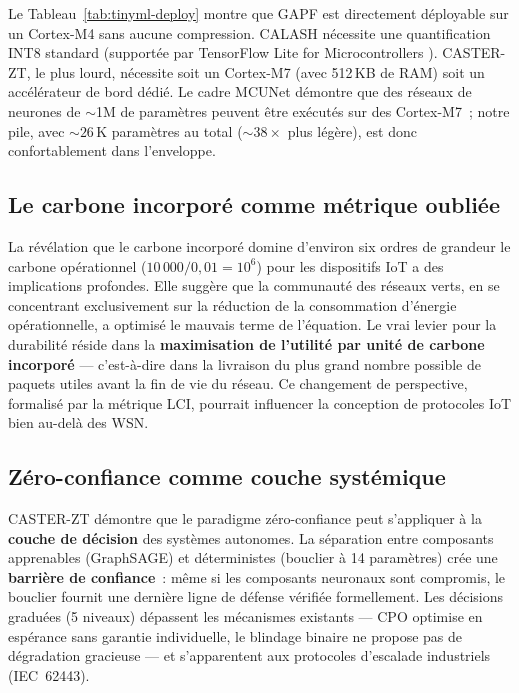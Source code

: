 Le Tableau~\ref{tab:tinyml-deploy} montre que GAPF est directement déployable sur un Cortex-M4 sans aucune compression. CALASH nécessite une quantification INT8 standard (supportée par TensorFlow Lite for Microcontrollers \cite{david2021tensorflow}). CASTER-ZT, le plus lourd, nécessite soit un Cortex-M7 (avec 512\,KB de RAM) soit un accélérateur de bord dédié. Le cadre MCUNet \cite{Lin2020MCUNet} démontre que des réseaux de neurones de $\sim$1M de paramètres peuvent être exécutés sur des Cortex-M7~; notre pile, avec ${\sim}26$\,K paramètres au total (${\sim}38\times$ plus légère), est donc confortablement dans l'enveloppe.

\subsection{Le carbone incorporé comme métrique oubliée}

La révélation que le carbone incorporé domine d'environ six ordres de grandeur le carbone opérationnel ($10\,000/0{,}01 = 10^6$) pour les dispositifs IoT a des implications profondes. Elle suggère que la communauté des réseaux verts, en se concentrant exclusivement sur la réduction de la consommation d'énergie opérationnelle, a optimisé le mauvais terme de l'équation. Le vrai levier pour la durabilité réside dans la \textbf{maximisation de l'utilité par unité de carbone incorporé} --- c'est-à-dire dans la livraison du plus grand nombre possible de paquets utiles avant la fin de vie du réseau. Ce changement de perspective, formalisé par la métrique LCI, pourrait influencer la conception de protocoles IoT bien au-delà des WSN.

\subsection{Zéro-confiance comme couche systémique}

CASTER-ZT démontre que le paradigme zéro-confiance peut s'appliquer à la \textbf{couche de décision} des systèmes autonomes. La séparation entre composants apprenables (GraphSAGE) et déterministes (bouclier à 14 paramètres) crée une \textbf{barrière de confiance}~: même si les composants neuronaux sont compromis, le bouclier fournit une dernière ligne de défense vérifiée formellement. Les décisions graduées (5 niveaux) dépassent les mécanismes existants --- CPO \cite{achiam2017cpo} optimise en espérance sans garantie individuelle, le blindage binaire \cite{alshiekh2018shielding} ne propose pas de dégradation gracieuse --- et s'apparentent aux protocoles d'escalade industriels (IEC~62443).

